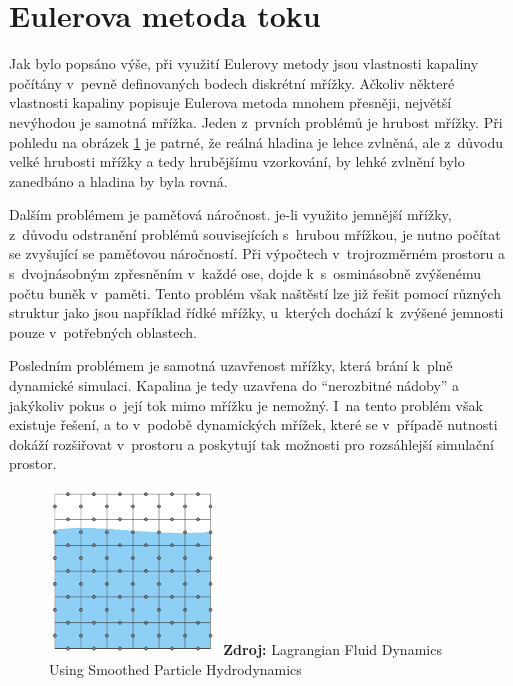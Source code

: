 \section{Eulerova metoda toku}
Jak bylo popsáno výše, při využití Eulerovy metody jsou vlastnosti kapaliny počítány v~pevně definovaných bodech diskrétní mřížky. Ačkoliv některé vlastnosti kapaliny popisuje Eulerova metoda mnohem přesněji, největší nevýhodou je samotná mřížka. Jeden z~prvních problémů je hrubost mřížky. Při pohledu na obrázek \ref{fig:EulerGrid} je patrné, že reálná hladina je lehce zvlněná, ale z~důvodu velké hrubosti mřížky a tedy hrubějšímu vzorkování, by lehké zvlnění bylo zanedbáno a hladina by byla rovná.

Dalším problémem je paměťová náročnost. je-li využito jemnější mřížky, z~důvodu odstranění problémů souvisejících s~hrubou mřížkou, je nutno počítat se zvyšující se paměťovou náročností. Při výpočtech v~trojrozměrném prostoru a s~dvojnásobným zpřesněním v~každé ose, dojde k~s~osminásobně zvýšenému počtu buněk v~paměti. Tento problém však naštěstí lze již řešit pomocí různých struktur jako jsou například řídké mřížky, u~kterých dochází k~zvýšené jemnosti pouze v~potřebných oblastech.

Posledním problémem je samotná uzavřenost mřížky, která brání k~plně dynamické simulaci. Kapalina je tedy uzavřena do \enquote{nerozbitné nádoby} a jakýkoliv pokus o~její tok mimo mřížku je nemožný. I~na tento problém však existuje řešení, a to v~podobě dynamických mřížek, které se v~případě nutnosti dokáží rozšiřovat v~prostoru a poskytují tak možnosti pro rozsáhlejší simulační prostor.
\cite{KelagerSPH}

\begin{figure}[hbt]
	\centering
	\captionsetup{justification=centering}
	\includegraphics[width=0.4\textwidth]{obrazky-figures/GridEuler.PNG}
	\textbf{Zdroj: } Lagrangian Fluid Dynamics Using Smoothed Particle Hydrodynamics \cite{KelagerSPH}
	\label{fig:EulerGrid}
\end{figure}

